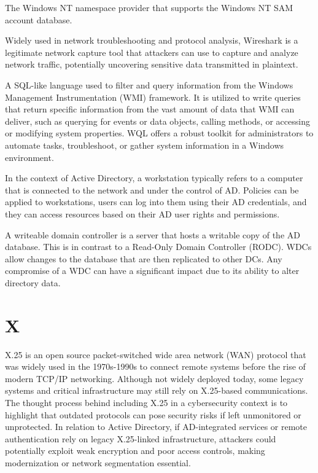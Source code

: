  The Windows NT namespace provider that supports the Windows NT SAM account database.

 Widely used in network troubleshooting and protocol analysis, Wireshark is a legitimate network capture tool that attackers can use to capture and analyze network traffic, potentially uncovering sensitive data transmitted in plaintext.

 A SQL-like language used to filter and query information from the Windows Management Instrumentation (WMI) framework. It is utilized to write queries that return specific information from the vast amount of data that WMI can deliver, such as querying for events or data objects, calling methods, or accessing or modifying system properties. WQL offers a robust toolkit for administrators to automate tasks, troubleshoot, or gather system information in a Windows environment.

 In the context of Active Directory, a workstation typically refers to a computer that is connected to the network and under the control of AD. Policies can be applied to workstations, users can log into them using their AD credentials, and they can access resources based on their AD user rights and permissions.

 A writeable domain controller is a server that hosts a writable copy of the AD database. This is in contrast to a Read-Only Domain Controller (RODC). WDCs allow changes to the database that are then replicated to other DCs. Any compromise of a WDC can have a significant impact due to its ability to alter directory data.

\section*{X}
 X.25 is an open source packet-switched wide area network (WAN) protocol that was widely used in the 1970s-1990s to connect remote systems before the rise of modern TCP/IP networking. Although not widely deployed today, some legacy systems and critical infrastructure may still rely on X.25-based communications. The thought process behind including X.25 in a cybersecurity context is to highlight that outdated protocols can pose security risks if left unmonitored or unprotected. In relation to Active Directory, if AD-integrated services or remote authentication rely on legacy X.25-linked infrastructure, attackers could potentially exploit weak encryption and poor access controls, making modernization or network segmentation essential.

